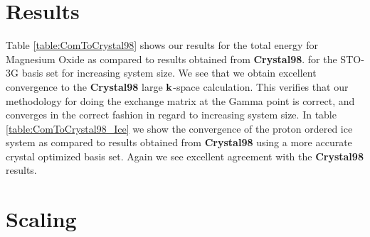 \documentclass[prb,aps,nobibnotes,twocolumn,doublespace,twocolumngrid,superbib]{revtex4}
\begin{document}
\begin{table}
\caption{Comparison \textbf{MondoSCF} and \textbf{Crystal98} for a proton ordered ice
test system within the Hartree-Fock approxiamtion using
a crystal optimized basis set\cite{CBS:511G:H,CBS:861G:MgO}. 
The \textbf{MondoSCF} calculations where done to
the accuracy of the quoted digits. All calculations where done at the Gamma point
for comparison except the last \textbf{Crystal98} calculation, which was done at 
${\bf k}_{max}=\{6,6,6\}$.}
\label{table:ComToCrystal98_Ice}
\end{table}



\section{Results}

Table \ref{table:ComToCrystal98} shows our results for the total
energy for Magnesium Oxide as compared to results obtained from \textbf{Crystal98}.
for the STO-3G basis set for increasing system size. We see that we obtain excellent
convergence to the {\bf Crystal98} large ${\bf k}$-space calculation. This verifies that
our methodology for doing the exchange matrix at the Gamma point is correct, and converges 
in the correct fashion in regard to increasing system size. In table \ref{table:ComToCrystal98_Ice}
we show the convergence of the proton ordered ice system as compared to results obtained from 
\textbf{Crystal98} using a more accurate crystal optimized basis set. Again we see excellent
agreement with the \textbf{Crystal98} results.


\section{Scaling}
 
\end{document}
